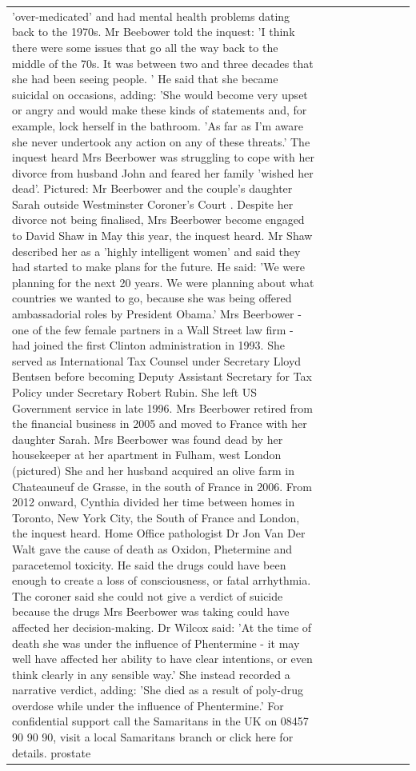 \begin{table}[H]
\begin{tabular}{lllrlllll}
'over-medicated' and had mental health problems dating back to the 1970s. Mr Beebower told the inquest: 'I think there were some issues that go all the way back to the middle of the 70s. It was between two and three decades that she had been seeing people. ' He said that she became suicidal on occasions, adding: 'She would become very upset or angry and would make these kinds of statements and, for example, lock herself in the bathroom. 'As far as I'm aware she never undertook any action on any of these threats.' The inquest heard Mrs Beerbower was struggling to cope with her divorce from husband John and feared her family 'wished her dead'. Pictured: Mr Beerbower and the couple's daughter Sarah outside Westminster Coroner's Court . Despite her divorce not being finalised, Mrs Beerbower become engaged to David Shaw in May this year, the inquest heard. Mr Shaw described her as a 'highly intelligent women' and said they had started to make plans for the future. He said: 'We were planning for the next 20 years. We were planning about what countries we wanted to go, because she was being offered ambassadorial roles by President Obama.' Mrs Beerbower - one of the few female partners in a Wall Street law firm - had joined the first Clinton administration in 1993. She served as International Tax Counsel under Secretary Lloyd Bentsen before becoming Deputy Assistant Secretary for Tax Policy under Secretary Robert Rubin. She left US Government service in late 1996. Mrs Beerbower retired from the financial business in 2005 and moved to France with her daughter Sarah. Mrs Beerbower was found dead by her housekeeper at her apartment in Fulham, west London (pictured) She and her husband acquired an olive farm in Chateauneuf de Grasse, in the south of France in 2006. From 2012 onward, Cynthia divided her time between homes in Toronto, New York City, the South of France and London, the inquest heard. Home Office pathologist Dr Jon Van Der Walt gave the cause of death as Oxidon, Phetermine and paracetemol toxicity. He said the drugs could have been enough to create a loss of consciousness, or fatal arrhythmia. The coroner said she could not give a verdict of suicide because the drugs Mrs Beerbower was taking could have affected her decision-making. Dr Wilcox said: 'At the time of death she was under the influence of Phentermine - it may well have affected her ability to have clear intentions, or even think clearly in any sensible way.' She instead recorded a narrative verdict, adding: 'She died as a result of poly-drug overdose while under the influence of Phentermine.' For confidential support call the Samaritans in the UK on 08457 90 90 90, visit a local Samaritans branch or click here for details. prostate \\

\end{tabular}
\end{table}
